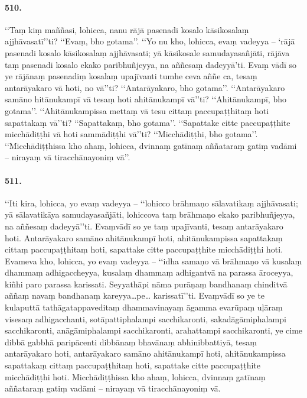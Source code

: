 \paragraph{510.} ‘‘Taṃ kiṃ maññasi, lohicca, nanu rājā pasenadi kosalo kāsikosalaṃ ajjhāvasatī’’ti? ‘‘Evaṃ, bho gotama’’. ‘‘Yo nu kho, lohicca, evaṃ vadeyya – ‘rājā pasenadi kosalo kāsikosalaṃ ajjhāvasati; yā kāsikosale samudayasañjāti, rājāva taṃ pasenadi kosalo ekako paribhuñjeyya, na aññesaṃ dadeyyā’ti. Evaṃ vādī so ye rājānaṃ pasenadiṃ kosalaṃ upajīvanti tumhe ceva aññe ca, tesaṃ antarāyakaro vā hoti, no vā’’ti? ‘‘Antarāyakaro, bho gotama’’. ‘‘Antarāyakaro samāno hitānukampī vā tesaṃ hoti ahitānukampī vā’’ti? ‘‘Ahitānukampī, bho gotama’’. ‘‘Ahitānukampissa mettaṃ vā tesu cittaṃ paccupaṭṭhitaṃ hoti sapattakaṃ vā’’ti? ‘‘Sapattakaṃ, bho gotama’’. ‘‘Sapattake citte paccupaṭṭhite micchādiṭṭhi vā hoti sammādiṭṭhi vā’’ti? ‘‘Micchādiṭṭhi, bho gotama’’. ‘‘Micchādiṭṭhissa kho ahaṃ, lohicca, dvinnaṃ gatīnaṃ aññataraṃ gatiṃ vadāmi – nirayaṃ vā tiracchānayoniṃ vā’’.

\paragraph{511.} ‘‘Iti kira, lohicca, yo evaṃ vadeyya – ‘‘lohicco brāhmaṇo sālavatikaṃ ajjhāvasati; yā sālavatikāya samudayasañjāti, lohiccova taṃ brāhmaṇo ekako paribhuñjeyya, na aññesaṃ dadeyyā’’ti. Evaṃvādī so ye taṃ upajīvanti, tesaṃ antarāyakaro hoti. Antarāyakaro samāno ahitānukampī hoti, ahitānukampissa sapattakaṃ cittaṃ paccupaṭṭhitaṃ hoti, sapattake citte paccupaṭṭhite micchādiṭṭhi hoti. Evameva kho, lohicca, yo evaṃ vadeyya – ‘‘idha samaṇo vā brāhmaṇo vā kusalaṃ dhammaṃ adhigaccheyya, kusalaṃ dhammaṃ adhigantvā na parassa āroceyya, kiñhi paro parassa karissati. Seyyathāpi nāma purāṇaṃ bandhanaṃ chinditvā aññaṃ navaṃ bandhanaṃ kareyya…pe… karissatī’’ti. Evaṃvādī so ye te kulaputtā tathāgatappaveditaṃ dhammavinayaṃ āgamma evarūpaṃ uḷāraṃ visesaṃ adhigacchanti, sotāpattiphalampi sacchikaronti, sakadāgāmiphalampi sacchikaronti, anāgāmiphalampi sacchikaronti, arahattampi sacchikaronti, ye cime dibbā gabbhā paripācenti dibbānaṃ bhavānaṃ abhinibbattiyā, tesaṃ antarāyakaro hoti, antarāyakaro samāno ahitānukampī hoti, ahitānukampissa sapattakaṃ cittaṃ paccupaṭṭhitaṃ hoti, sapattake citte paccupaṭṭhite micchādiṭṭhi hoti. Micchādiṭṭhissa kho ahaṃ, lohicca, dvinnaṃ gatīnaṃ aññataraṃ gatiṃ vadāmi – nirayaṃ vā tiracchānayoniṃ vā.


